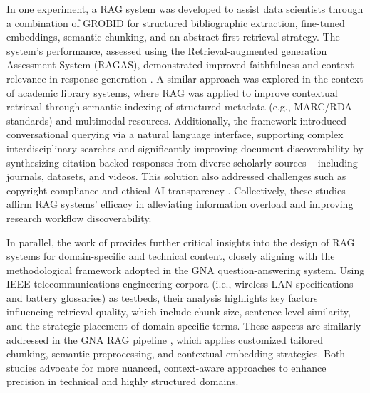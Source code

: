 \begin{spacing}{1.5}
\noindent In one experiment, a RAG system was developed to assist data scientists through a combination of GROBID for structured bibliographic extraction, fine-tuned embeddings, semantic chunking, and an abstract-first retrieval strategy. The system's performance, assessed using the Retrieval-augmented generation Assessment System (RAGAS), demonstrated improved faithfulness and context relevance in response generation \citep{aytar_retrieval-augmented_2024}. A similar approach was explored in the context of academic library systems, where RAG was applied to improve contextual retrieval through semantic indexing of structured metadata (e.g., MARC/RDA standards) and multimodal resources. Additionally, the framework introduced conversational querying via a natural language interface, supporting complex interdisciplinary searches and significantly improving document discoverability by synthesizing citation-backed responses from diverse scholarly sources -- including journals, datasets, and videos. This solution also addressed challenges such as copyright compliance and ethical AI transparency \citep{bevara_prospects_2025}.  Collectively, these studies affirm RAG systems’ efficacy in alleviating information overload and improving research workflow discoverability.

In parallel, the work of \citep{soman_observations_2024} provides further critical insights into the design of RAG systems for domain-specific and technical content, closely aligning with the methodological framework adopted in the GNA question-answering system. Using IEEE telecommunications engineering corpora (i.e., wireless LAN specifications and battery glossaries) as testbeds, their analysis highlights key factors influencing retrieval quality, which include chunk size, sentence-level similarity, and the strategic placement of domain-specific terms. These aspects are similarly addressed in the GNA RAG pipeline \citep{pograri_question-answering_2025}, which applies customized tailored chunking, semantic preprocessing, and contextual embedding strategies. Both studies advocate for more nuanced, context-aware approaches to enhance precision in technical and highly structured domains.


\end{spacing}
